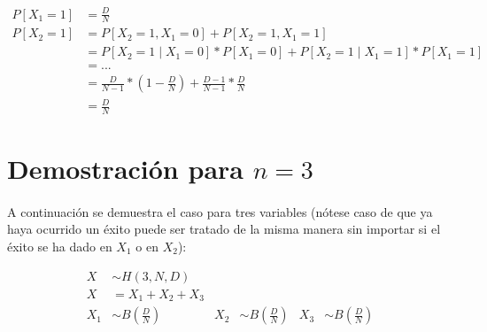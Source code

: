 \documentclass{article}
\begin{document}
    \begin{align}
      P[X_1 = 1]  &= \frac{D}{N}\\
      P[X_2 = 1]  &= P[X_2 = 1 , X_1 = 0] + P[X_2 = 1 , X_1 = 1] \\
                  &= P[X_2 = 1 \mid X_1 = 0]*P[X_1 = 0] + P[X_2 = 1 \mid X_1 = 1]*P[X_1 = 1] \\
                  &= ... \\
                  &= \frac{D}{N-1}*(1-\frac{D}{N}) + \frac{D-1}{N-1}*\frac{D}{N} \\
                  &= \frac{D}{N}
    \end{align}

  \clearpage
  \section{Demostración para $n=3$}
  \label{sec:demostration_1}

  \paragraph{}
  A continuación se demuestra el caso para tres variables (nótese caso de que ya haya ocurrido un éxito puede ser tratado de la misma manera sin importar si el éxito se ha dado en $X_1$ o en $X_2$):

  \begin{align}
    X   &\sim H(3, N, D)   \\
    X   &= X_1 + X_2 + X_3 \\
    X_1 &\sim B(\frac{D}{N}) & X_2 &\sim B(\frac{D}{N}) & X_3 &\sim B(\frac{D}{N})\\
  \end{align}
\end{document}
